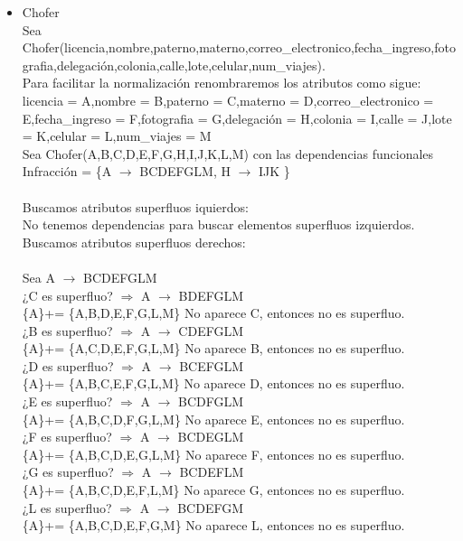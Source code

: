 \documentclass{article}
\begin{document}
\begin{itemize}
\item Chofer\\
Sea Chofer(licencia,nombre,paterno,materno,correo\_electronico,fecha\_ingreso,fotografia,delegación,colonia,calle,lote,celular,num\_viajes).\\
Para facilitar la normalización renombraremos los atributos como sigue:
licencia = A,nombre = B,paterno = C,materno = D,correo\_electronico = E,fecha\_ingreso = F,fotografia = G,delegación = H,colonia = I,calle = J,lote = K,celular = L,num\_viajes = M\\
Sea Chofer(A,B,C,D,E,F,G,H,I,J,K,L,M) con las dependencias funcionales 
Infracción = \{A $\rightarrow$ BCDEFGLM, H $\rightarrow$ IJK  \} \\
\\
Buscamos atributos superfluos iquierdos:\\
No tenemos dependencias para buscar elementos superfluos izquierdos.\\
Buscamos atributos superfluos derechos:\\
\\
Sea A $\rightarrow$ BCDEFGLM\\
¿C es superfluo? $\Rightarrow$ A $\rightarrow$ BDEFGLM \\
\{A\}+= \{A,B,D,E,F,G,L,M\} No aparece C, entonces no es superfluo.\\
¿B es superfluo? $\Rightarrow$ A $\rightarrow$ CDEFGLM \\
\{A\}+= \{A,C,D,E,F,G,L,M\} No aparece B, entonces no es superfluo.\\
¿D es superfluo? $\Rightarrow$ A $\rightarrow$ BCEFGLM \\
\{A\}+= \{A,B,C,E,F,G,L,M\}  No aparece D, entonces no es superfluo.\\
¿E es superfluo? $\Rightarrow$ A $\rightarrow$ BCDFGLM \\
\{A\}+= \{A,B,C,D,F,G,L,M\}  No aparece E, entonces no es superfluo.\\
¿F es superfluo? $\Rightarrow$ A $\rightarrow$ BCDEGLM \\
\{A\}+= \{A,B,C,D,E,G,L,M\}  No aparece F, entonces no es superfluo.\\
¿G es superfluo? $\Rightarrow$ A $\rightarrow$ BCDEFLM \\
\{A\}+= \{A,B,C,D,E,F,L,M\}  No aparece G, entonces no es superfluo.\\
¿L es superfluo? $\Rightarrow$ A $\rightarrow$ BCDEFGM \\
\{A\}+= \{A,B,C,D,E,F,G,M\}  No aparece L, entonces no es superfluo.\\

\end{itemize}
\end{document}

